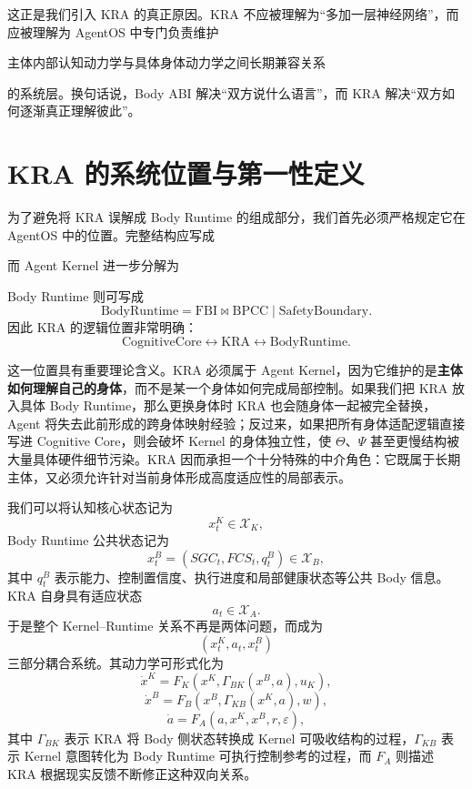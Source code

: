 这正是我们引入 KRA 的真正原因。KRA 不应被理解为``多加一层神经网络''，而应被理解为 AgentOS 中专门负责维护
\begin{statementbox}
主体内部认知动力学与具体身体动力学之间长期兼容关系
\end{statementbox}
的系统层。换句话说，Body ABI 解决``双方说什么语言''，而 KRA 解决``双方如何逐渐真正理解彼此''。

\section{KRA 的系统位置与第一性定义}
\label{sec:kra-position-definition}

为了避免将 KRA 误解成 Body Runtime 的组成部分，我们首先必须严格规定它在 AgentOS 中的位置。完整结构应写成
\begin{statementbox}
\centering
{}
\end{statementbox}
而 Agent Kernel 进一步分解为
\begin{statementbox}
\centering
{}
\end{statementbox}
Body Runtime 则可写成
\[
\mathrm{BodyRuntime}
=
\mathrm{FBI}
\bowtie
\mathrm{BPCC}
\mid
\mathrm{SafetyBoundary}.
\]
因此 KRA 的逻辑位置非常明确：
\[
\mathrm{CognitiveCore}
\longleftrightarrow
\boxed{\mathrm{KRA}}
\longleftrightarrow
\mathrm{BodyRuntime}.
\]

这一位置具有重要理论含义。KRA 必须属于 Agent Kernel，因为它维护的是\textbf{主体如何理解自己的身体}，而不是某一个身体如何完成局部控制。如果我们把 KRA 放入具体 Body Runtime，那么更换身体时 KRA 也会随身体一起被完全替换，Agent 将失去此前形成的跨身体映射经验；反过来，如果把所有身体适配逻辑直接写进 Cognitive Core，则会破坏 Kernel 的身体独立性，使 $\Theta$、$\Psi$ 甚至更慢结构被大量具体硬件细节污染。KRA 因而承担一个十分特殊的中介角色：它既属于长期主体，又必须允许针对当前身体形成高度适应性的局部表示。

我们可以将认知核心状态记为
\[
x^K_t\in\mathcal X_K,
\]
Body Runtime 公共状态记为
\[
x^B_t
=
\left(
SGC_t,
FCS_t,
q^{B}_t
\right)
\in\mathcal X_B,
\]
其中 $q^B_t$ 表示能力、控制置信度、执行进度和局部健康状态等公共 Body 信息。KRA 自身具有适应状态
\[
a_t\in\mathcal X_A.
\]
于是整个 Kernel--Runtime 关系不再是两体问题，而成为
\[
\boxed{
(x^K_t,a_t,x^B_t)
}
\]
三部分耦合系统。其动力学可形式化为
\[
\dot x^K
=
F_K
\left(
x^K,
\Gamma_{BK}(x^B,a),
u_K
\right),
\]
\[
\dot x^B
=
F_B
\left(
x^B,
\Gamma_{KB}(x^K,a),
w
\right),
\]
\[
\dot a
=
F_A
\left(
a,
x^K,
x^B,
r,
\varepsilon
\right),
\]
其中 $\Gamma_{BK}$ 表示 KRA 将 Body 侧状态转换成 Kernel 可吸收结构的过程，$\Gamma_{KB}$ 表示 Kernel 意图转化为 Body Runtime 可执行控制参考的过程，而 $F_A$ 则描述 KRA 根据现实反馈不断修正这种双向关系。

